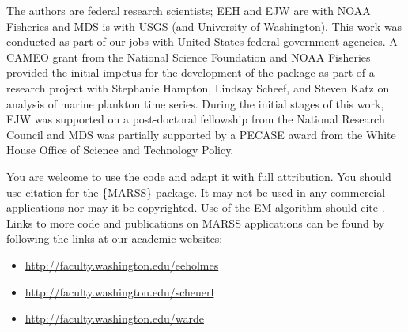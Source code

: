The authors are federal research scientists; EEH and EJW are with NOAA Fisheries and MDS is with USGS (and University of Washington).  This work was conducted as part of our jobs with United States federal government agencies.   A CAMEO grant from the National Science Foundation and NOAA Fisheries provided the initial impetus for the development of the package as part of a research project with Stephanie Hampton, Lindsay Scheef, and Steven Katz on analysis of marine plankton time series.  During the initial stages of this work, EJW was supported on a post-doctoral fellowship from the National Research Council and MDS was partially supported by a PECASE award from the White House Office of Science and Technology Policy.

You are welcome to use the code and adapt it with full attribution.  You should use citation \citet{Holmesetal2012} for the \{MARSS\} package.  It may not be used in any commercial applications nor may it be copyrighted.  Use of the EM algorithm should cite \citet{Holmes2010}. Links to more code and publications on MARSS applications can be found by following the links at our academic websites:
\begin{itemize}
\item \url{http://faculty.washington.edu/eeholmes}
\item \url{http://faculty.washington.edu/scheuerl}
\item \url{http://faculty.washington.edu/warde}
\end{itemize}